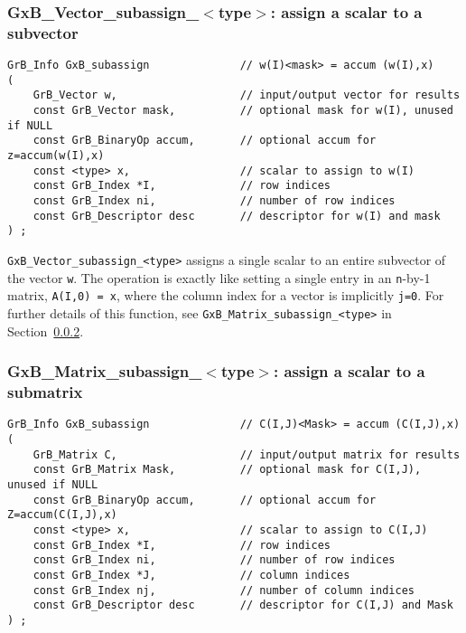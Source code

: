 \documentclass[12pt]{article}
\begin{document}
\subsubsection{{\sf GxB\_Vector\_subassign\_$<$type$>$:} assign a scalar to a subvector}
\label{subassign_vector_scalar}

\begin{mdframed}[userdefinedwidth=6in]
{\footnotesize
\begin{verbatim}
GrB_Info GxB_subassign              // w(I)<mask> = accum (w(I),x)
(
    GrB_Vector w,                   // input/output vector for results
    const GrB_Vector mask,          // optional mask for w(I), unused if NULL
    const GrB_BinaryOp accum,       // optional accum for z=accum(w(I),x)
    const <type> x,                 // scalar to assign to w(I)
    const GrB_Index *I,             // row indices
    const GrB_Index ni,             // number of row indices
    const GrB_Descriptor desc       // descriptor for w(I) and mask
) ;
\end{verbatim} } \end{mdframed}

\verb'GxB_Vector_subassign_<type>' assigns a single scalar to an entire
subvector of the vector \verb'w'.  The operation is exactly like setting a
single entry in an \verb'n'-by-1 matrix, \verb'A(I,0) = x', where the column
index for a vector is implicitly \verb'j=0'.  For further details of this
function, see \verb'GxB_Matrix_subassign_<type>' in
Section~\ref{subassign_matrix_scalar}.

\newpage
\subsubsection{{\sf GxB\_Matrix\_subassign\_$<$type$>$:} assign a scalar to a submatrix}
\label{subassign_matrix_scalar}

\begin{mdframed}[userdefinedwidth=6in]
{\footnotesize
\begin{verbatim}
GrB_Info GxB_subassign              // C(I,J)<Mask> = accum (C(I,J),x)
(
    GrB_Matrix C,                   // input/output matrix for results
    const GrB_Matrix Mask,          // optional mask for C(I,J), unused if NULL
    const GrB_BinaryOp accum,       // optional accum for Z=accum(C(I,J),x)
    const <type> x,                 // scalar to assign to C(I,J)
    const GrB_Index *I,             // row indices
    const GrB_Index ni,             // number of row indices
    const GrB_Index *J,             // column indices
    const GrB_Index nj,             // number of column indices
    const GrB_Descriptor desc       // descriptor for C(I,J) and Mask
) ;
\end{verbatim} } \end{mdframed}
\end{document}
